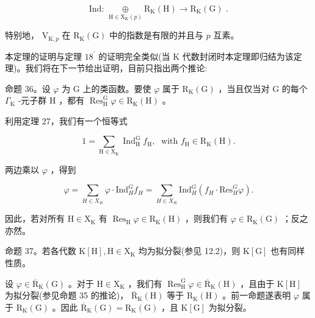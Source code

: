 \documentclass[10pt]{article}
\begin{document}
\[
\text{ Ind: }\underset{\mathrm{H} \in  {\mathrm{X}}_{\mathrm{K}}\left( p\right) }{ \oplus  }{\mathrm{R}}_{\mathrm{K}}\left( \mathrm{H}\right)  \rightarrow  {\mathrm{R}}_{\mathrm{K}}\left( \mathrm{G}\right) \text{ . }
\]

特别地， \({\mathrm{V}}_{\mathrm{K},p}\) 在 \({\mathrm{R}}_{\mathrm{K}}\left( \mathrm{G}\right)\) 中的指数是有限的并且与 \(p\) 互素。

本定理的证明与定理 \({18}^{\prime }\) 的证明完全类似(当 \(\mathrm{K}\) 代数封闭时本定理即归结为该定理)。我们将在下一节给出证明，目前只指出两个推论:

命题 36。设 \(\varphi\) 为 G 上的类函数。要使 \(\varphi\) 属于 \({\mathrm{R}}_{\mathrm{K}}\left( \mathrm{G}\right)\) ，当且仅当对 \(\mathrm{G}\) 的每个 \({\Gamma }_{\mathrm{K}}\) -元子群 \(\mathrm{H}\) ，都有 \({\operatorname{Res}}_{\mathrm{H}}^{\mathrm{G}}\varphi  \in  {\mathrm{R}}_{\mathrm{K}}\left( \mathrm{H}\right)\) 。

利用定理 27，我们有一个恒等式

\[
1 = \mathop{\sum }\limits_{{\mathrm{H} \in  {\mathrm{X}}_{\mathrm{K}}}}{\operatorname{Ind}}_{\mathrm{H}}^{\mathrm{G}}{f}_{\mathrm{H}},\;\text{ with }{f}_{\mathrm{H}} \in  {\mathrm{R}}_{\mathrm{K}}\left( \mathrm{H}\right) .
\]

两边乘以 \(\varphi\) ，得到

\[
\varphi  = \mathop{\sum }\limits_{{H \in  {X}_{K}}}\varphi  \cdot  {\mathrm{{Ind}}}_{H}^{G}{f}_{H} = \mathop{\sum }\limits_{{H \in  {X}_{K}}}{\mathrm{{Ind}}}_{H}^{G}\left( {{f}_{H} \cdot  {\mathrm{{Res}}}_{H}^{G}\varphi }\right) .
\]

因此，若对所有 \(\mathrm{H} \in  {\mathrm{X}}_{\mathrm{K}}\) 有 \({\operatorname{Res}}_{\mathrm{H}}\varphi  \in  {\mathrm{R}}_{\mathrm{K}}\left( \mathrm{H}\right)\) ，则我们有 \(\varphi  \in  {\mathrm{R}}_{\mathrm{K}}\left( \mathrm{G}\right)\) ；反之亦然。

命题 37。若各代数 \(\mathrm{K}\left\lbrack  \mathrm{H}\right\rbrack  ,\mathrm{H} \in  {\mathrm{X}}_{\mathrm{K}}\) 均为拟分裂(参见 12.2)，则 \(\mathrm{K}\left\lbrack  \mathrm{G}\right\rbrack\) 也有同样性质。

设 \(\varphi  \in  {\overline{\mathrm{R}}}_{\mathrm{K}}\left( \mathrm{G}\right)\) 。对于 \(\mathrm{H} \in  {\mathrm{X}}_{\mathrm{K}}\) ，我们有 \({\operatorname{Res}}_{\mathrm{H}}^{\mathrm{G}}\varphi  \in  {\overline{\mathrm{R}}}_{\mathrm{K}}\left( \mathrm{H}\right)\) ，且由于 \(\mathrm{K}\left\lbrack  \mathrm{H}\right\rbrack\) 为拟分裂(参见命题 35 的推论)， \({\overline{\mathrm{R}}}_{\mathrm{K}}\left( \mathrm{H}\right)\) 等于 \({\mathrm{R}}_{\mathrm{K}}\left( \mathrm{H}\right)\) 。前一命题遂表明 \(\varphi\) 属于 \({\mathrm{R}}_{\mathrm{K}}\left( \mathrm{G}\right)\) 。因此 \({\overline{\mathrm{R}}}_{\mathrm{K}}\left( \mathrm{G}\right)  = {\mathrm{R}}_{\mathrm{K}}\left( \mathrm{G}\right)\) ，且 \(\mathrm{K}\left\lbrack  \mathrm{G}\right\rbrack\) 为拟分裂。
\end{document}
